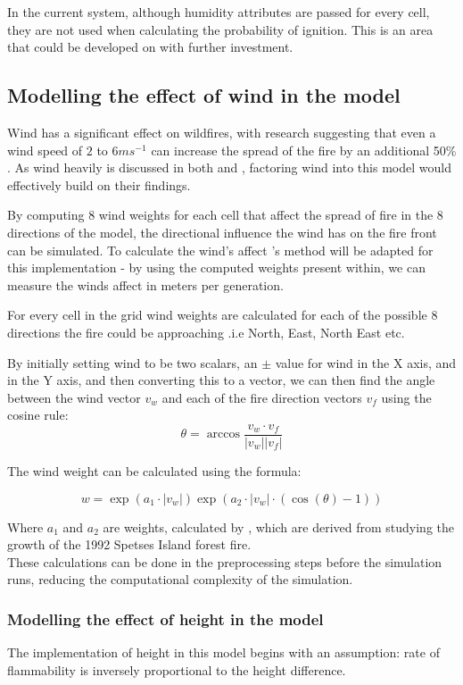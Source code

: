 \documentclass[11pt, a4paper, titlepage]{article}
\begin{document}
In the current system, although humidity attributes are passed for every cell, they are not used when calculating the probability of ignition. This is an area that could be developed on with further investment. 

\subsection{Modelling the effect of wind in the model}
Wind has a significant effect on wildfires, with research suggesting that even a wind speed of $2$ to $6ms^{-1}$ can increase the spread of the fire by an additional 50\% \cite{Beer1991}. As wind heavily is discussed in both \cite{ALEXANDRIDIS2008191} and \cite{HERNANDEZENCINAS20071213}, factoring wind into this model would effectively build on their findings.

By computing 8 wind weights for each cell that affect the spread of fire in the 8 directions of the model, the directional influence the wind has on the fire front can be simulated. To calculate the wind's affect \cite{ALEXANDRIDIS2008191}'s method will be adapted for this implementation - by using the computed weights present within, we can measure the winds affect in meters per generation.

For every cell in the grid wind weights are calculated for each of the possible 8 directions the fire could be approaching .i.e North, East, North East etc.

By initially setting wind to be two scalars, an $\pm$ value for wind in the X axis, and in the Y axis, and then converting this to a vector, we can then find the angle between the wind vector $v_w$ and each of the fire direction vectors $v_f$ using the cosine rule:
\[\theta = \arccos{ \frac{v_w \cdot v_f}{|v_w||v_f|} }\]

The wind weight can be calculated using the formula:

\[w = \exp{(a_1 \cdot |v_w|)} \exp{(a_2 \cdot |v_w| \cdot (\cos(\theta) - 1))}\]

Where $a_1$ and $a_2$ are weights, calculated by \cite{ALEXANDRIDIS2008191}, which are derived from studying the growth of the 1992 Spetses Island forest fire.\\
These calculations can be done in the preprocessing steps before the simulation runs, reducing the computational complexity of the simulation.

\subsubsection{Modelling the effect of height in the model}
The implementation of height in this model begins with an assumption: rate of flammability is inversely proportional to the height difference.
\end{document}
